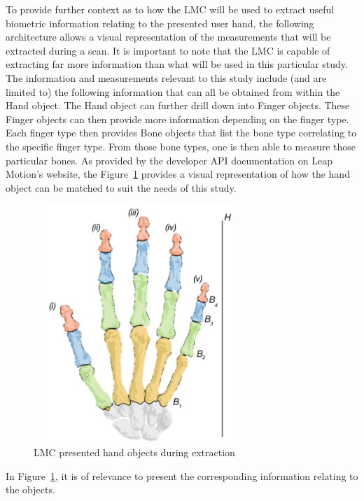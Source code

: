 To provide further context as to how the LMC will be used to extract useful biometric information relating to the presented user hand, the following architecture allows a visual representation of the measurements that will be extracted during a scan. It is important to note that the LMC is capable of extracting far more information than what will be used in this particular study. The information and measurements relevant to this study include (and are limited to) the following information that can all be obtained from within the Hand object. The Hand object can further drill down into Finger objects. These Finger objects can then provide more information depending on the finger type. Each finger type then provides Bone objects that list the bone type correlating to the specific finger type. From those bone types, one is then able to measure those particular bones.  As provided by the developer API documentation on Leap Motion’s website, the Figure~\ref{fig:LMC presented hand objects during extraction} provides a visual representation of how the hand object can be matched to suit the needs of this study.

    
    \begin{figure}[htbp!] 
    \centering    
    \includegraphics[width=8cm,height=9cm,keepaspectratio]{Chapter3/Figs/LMC_presented_hand_objects_during_extraction.png}
    \caption[LMC presented hand objects during extraction]{LMC presented hand objects during extraction}
    \label{fig:LMC presented hand objects during extraction}
    \end{figure}

In Figure~\ref{fig:LMC presented hand objects during extraction}, it is of relevance to present the corresponding information relating to the objects.

